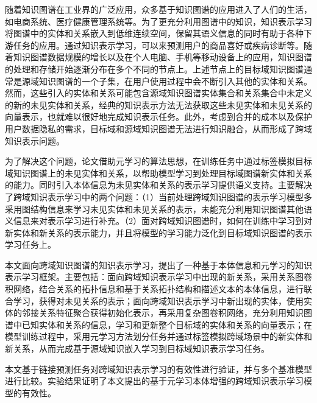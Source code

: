 随着知识图谱在工业界的广泛应用，众多基于知识图谱的应用进入了人们的生活，如电商系统、医疗健康管理系统等。为了更充分利用图谱中的知识，知识表示学习将图谱中的实体和关系嵌入到低维连续空间，保留其语义信息的同时有助于各种下游任务的应用。通过知识表示学习，可以来预测用户的商品喜好或疾病诊断等。随着知识图谱数据规模的增长以及在个人电脑、手机等移动设备上的应用，知识图谱的处理和存储开始逐渐分布在多个不同的节点上。上述节点上的目标域知识图谱通常是源域知识图谱的一个子集，在用户使用过程中会不断引入其他的实体和关系。然而，这些引入的实体和关系可能包含源域知识图谱实体集合和关系集合中未定义的新的未见实体和关系，经典的知识表示方法无法获取这些未见实体和未见关系的向量表示，也就难以很好地完成知识表示任务。此外，考虑到合并的成本以及保护用户数据隐私的需求，目标域和源域知识图谱无法进行知识融合，从而形成了跨域知识表示问题。

为了解决这个问题，论文借助元学习的算法思想，在训练任务中通过标签模拟目标域知识图谱上的未见实体和关系，以帮助模型学习到处理目标域图谱新实体和关系的能力。同时引入本体信息为未见实体和关系的表示学习提供语义支持。主要解决了跨域知识表示学习中的两个问题：（1）当前处理跨域知识图谱的表示学习模型多采用图结构信息来学习未见实体和未见关系的表示，未能充分利用知识图谱其他语义信息来对表示学习进行补充。（2）面对跨域知识图谱时，如何在训练中学习到对新实体和新关系的表示能力，并且将模型的学习能力泛化到目标域知识图谱的表示学习任务上。

本文面向跨域知识图谱的知识表示学习，提出了一种基于本体信息和元学习的知识表示学习框架。主要包括：面向跨域知识表示学习中出现的新关系，采用关系图卷积网络，结合关系的拓扑信息和基于关系拓扑结构和描述文本的本体信息，进行联合学习，获得对未见关系的表示；面向跨域知识表示学习中新出现的实体，使用实体的邻接关系特征聚合获得初始化表示，再采用复杂图卷积网络，充分利用知识图谱中已知实体和关系的信息，学习和更新整个目标域的实体和关系的向量表示；在模型训练过程中，采用元学习方法划分任务并通过标签模拟跨域场景中的新实体和新关系，从而完成基于源域知识嵌入学习到目标域知识表示学习任务。

本文基于链接预测任务对跨域知识表示学习的有效性进行验证，并与多个基准模型进行比较。实验结果证明了本文提出的基于元学习本体增强的跨域知识表示学习模型的有效性。